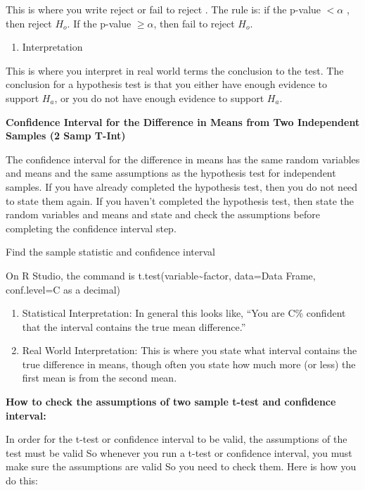 \documentclass[]{book}
\providecommand{\tightlist}{%
  \setlength{\itemsep}{0pt}\setlength{\parskip}{0pt}}
\begin{document}
This is where you write reject or fail to reject . The rule is: if the p-value \(<\alpha\) , then reject \(H_o\). If the p-value \(\ge \alpha\), then fail to reject \(H_o\).

\begin{enumerate}
\def\labelenumi{\arabic{enumi}.}
\setcounter{enumi}{5}
\tightlist
\item
  Interpretation
\end{enumerate}

This is where you interpret in real world terms the conclusion to the test. The conclusion for a hypothesis test is that you either have enough evidence to support \(H_a\), or you do not have enough evidence to support \(H_a\).

\textbf{Confidence Interval for the Difference in Means from Two Independent Samples (2 Samp T-Int)}

The confidence interval for the difference in means has the same random variables and means and the same assumptions as the hypothesis test for independent samples. If you have already completed the hypothesis test, then you do not need to state them again. If you haven't completed the hypothesis test, then state the random variables and means and state and check the assumptions before completing the confidence interval step.

Find the sample statistic and confidence interval

On R Studio, the command is t.test(variable\textasciitilde{}factor, data=Data Frame, conf.level=C as a decimal)

\begin{enumerate}
\def\labelenumi{\arabic{enumi}.}
\setcounter{enumi}{1}
\item
  Statistical Interpretation: In general this looks like, ``You are C\% confident that the interval contains the true mean difference.''
\item
  Real World Interpretation: This is where you state what interval contains the true difference in means, though often you state how much more (or less) the first mean is from the second mean.
\end{enumerate}

\textbf{How to check the assumptions of two sample t-test and confidence interval:}

In order for the t-test or confidence interval to be valid, the assumptions of the test must be valid So whenever you run a t-test or confidence interval, you must make sure the assumptions are valid So you need to check them. Here is how you do this:
\end{document}
